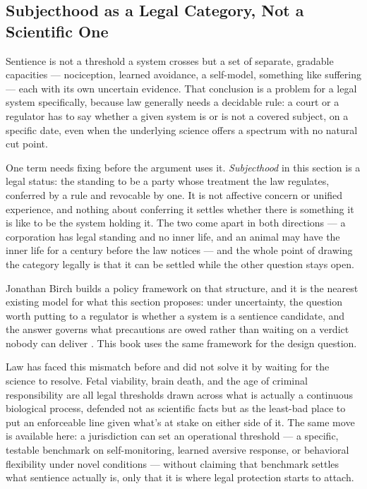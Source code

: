 \subsection{Subjecthood as a Legal Category, Not a Scientific One}
\label{sec:subjecthood-scientific}
Sentience is not a threshold a system crosses but a set of separate, gradable capacities — nociception, learned avoidance, a self-model, something like suffering — each with its own uncertain evidence. That conclusion is a problem for a legal system specifically, because law generally needs a decidable rule: a court or a regulator has to say whether a given system is or is not a covered subject, on a specific date, even when the underlying science offers a spectrum with no natural cut point.

One term needs fixing before the argument uses it. \emph{Subjecthood} in this section is a legal status: the standing to be a party whose treatment the law regulates, conferred by a rule and revocable by one. It is not affective concern or unified experience, and nothing about conferring it settles whether there is something it is like to be the system holding it. The two come apart in both directions — a corporation has legal standing and no inner life, and an animal may have the inner life for a century before the law notices — and the whole point of drawing the category legally is that it can be settled while the other question stays open.

Jonathan Birch builds a policy framework on that structure, and it is the nearest existing model for what this section proposes: under uncertainty, the question worth putting to a regulator is whether a system is a sentience candidate, and the answer governs what precautions are owed rather than waiting on a verdict nobody can deliver \autocite{birch2024edge}. This book uses the same framework for the design question.

Law has faced this mismatch before and did not solve it by waiting for the science to resolve. Fetal viability, brain death, and the age of criminal responsibility are all legal thresholds drawn across what is actually a continuous biological process, defended not as scientific facts but as the least-bad place to put an enforceable line given what's at stake on either side of it. The same move is available here: a jurisdiction can set an operational threshold — a specific, testable benchmark on self-monitoring, learned aversive response, or behavioral flexibility under novel conditions — without claiming that benchmark settles what sentience actually is, only that it is where legal protection starts to attach.


